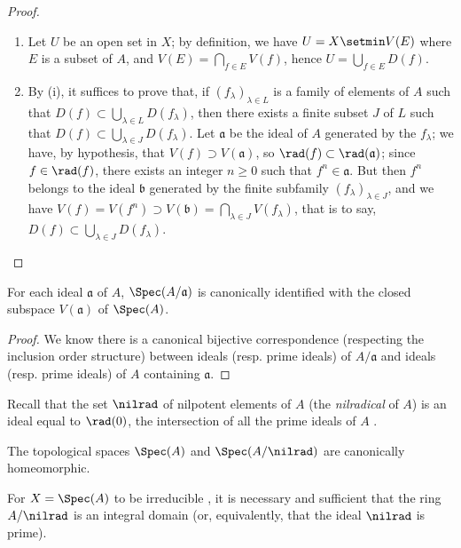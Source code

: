 \begin{proof}
\medskip\noindent
\begin{enumerate}
  \item[(i)] Let $U$ be an open set in $X$;
    by definition, we have $U=X\setmin V(E)$ where $E$ is a subset of $A$, and $V(E)=\bigcap_{f\in E}V(f)$, hence $U=\bigcup_{f\in E}D(f)$.
  \item[(ii)] By (i), it suffices to prove that, if $(f_\lambda)_{\lambda\in L}$ is a family of elements of $A$ such that $D(f)\subset\bigcup_{\lambda\in L}D(f_\lambda)$, then there exists a finite subset $J$ of $L$ such that $D(f)\subset\bigcup_{\lambda\in J}D(f_\lambda)$.
    Let $\mathfrak{a}$ be the ideal of $A$ generated by the $f_\lambda$;
    we have, by hypothesis, that $V(f)\supset V(\mathfrak{a})$, so $\rad(f)\subset\rad(\mathfrak{a})$;
    since $f\in\rad(f)$, there exists an integer $n\geq 0$ such that $f^n\in\mathfrak{a}$.
    But then $f^n$ belongs to the ideal $\mathfrak{b}$ generated by the finite subfamily $(f_\lambda)_{\lambda\in J}$, and we have $V(f)=V(f^n)\supset V(\mathfrak{b})=\bigcap_{\lambda\in J}V(f_\lambda)$, that is to say, $D(f)\subset\bigcup_{\lambda\in J}D(f_\lambda)$.
\end{enumerate}
\end{proof}

\begin{proposition}[1.1.11]
\label{I.1.1.11}
For each ideal $\mathfrak{a}$ of $A$, $\Spec(A/\mathfrak{a})$ is canonically identified with the closed subspace $V(\mathfrak{a})$ of $\Spec(A)$.
\end{proposition}

\begin{proof}
We know there is a canonical bijective correspondence (respecting the inclusion order structure) between ideals (resp. prime ideals) of $A/\mathfrak{a}$ and ideals (resp. prime ideals) of $A$ containing $\mathfrak{a}$.
\end{proof}

Recall that the set $\nilrad$ of nilpotent elements of $A$ (the \emph{nilradical} of $A$) is an ideal equal to $\rad(0)$, the intersection of all the prime ideals of $A$ .

\begin{corollary}[1.1.12]
\label{I.1.1.12}
The topological spaces $\Spec(A)$ and $\Spec(A/\nilrad)$ are canonically homeomorphic.
\end{corollary}

\begin{proposition}[1.1.13]
\label{I.1.1.13}
For $X=\Spec(A)$ to be irreducible , it is necessary and sufficient that the ring $A/\nilrad$ is an integral domain (or, equivalently, that the ideal $\nilrad$ is prime).
\end{proposition}

